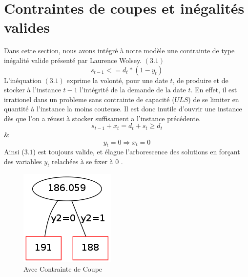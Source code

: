 \documentclass[a4paper,11pt,twoside]{report}
\begin{document}
\section{Contraintes de coupes et inégalités valides}
Dans cette section, nous avons intégré à notre modèle une contrainte de type inégalité valide présenté par Laurence Wolsey. $(3.1)$
\begin{equation}
s_{t-1} <= d_{t}*(1-y_{t})
\end{equation}
L'inéquation $(3.1)$ exprime la volonté, pour une date $t$, de produire et de stocker à l'instance $t-1$ l'intégrité de la demande de la date $t$.
En effet, il est irrationel dans un probleme sans contrainte de capacité ($ULS$) de se limiter en quantité à l'instance la moins couteuse.
Il est donc inutile d'ouvrir une instance dès que l'on a réussi à stocker suffisament a l'instance précédente.
\begin{equation}
s_{t-1}+x_{t} = d_{t}+s_{t} \geq d_{t}
\end{equation}
 \&
\begin{equation}
y_{t}=0 \Rightarrow x_{t}=0
\end{equation}
Ainsi ($3.1$) est toujours valide, et élague l'arborescence des solutions en forçant des variables $y_{t}$ relachées à se fixer à 0 .

\begin{figure}[h]
 \centering
 \includegraphics[width=\textwidth/4]{graph3.png}
 \caption{Avec Contrainte de Coupe}
 \label{graph2}
\end{figure}
\end{document}
